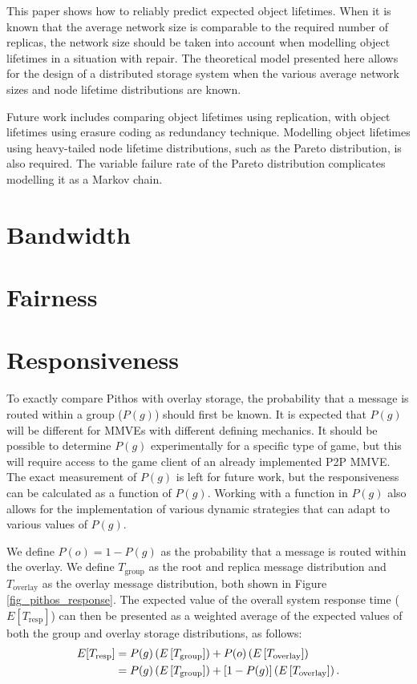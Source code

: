 This paper shows how to reliably predict expected object lifetimes. When it is known that the average network size is comparable to the required number of replicas, the network size should be taken into account when modelling object lifetimes in a situation with repair. The theoretical model presented here allows for the design of a distributed storage system when the various average network sizes and node lifetime distributions are known.

Future work includes comparing object lifetimes using replication, with object lifetimes using erasure coding as redundancy technique. Modelling object lifetimes using heavy-tailed node lifetime distributions, such as the Pareto distribution, is also required. The variable failure rate of the Pareto distribution complicates modelling it as a Markov chain.

\section{Bandwidth}


\section{Fairness}



\section{Responsiveness}
To exactly compare Pithos with overlay storage, the probability that a message is routed within a group ($P(g)$) should first be known. It is
expected that $P(g)$ will be different for MMVEs with different defining mechanics. It should be possible to determine $P(g)$ experimentally for a
specific type of game, but this will require access to the game client of an already implemented P2P MMVE. The exact measurement of $P(g)$ is left
for future work, but the responsiveness can be calculated as a function of $P(g)$. Working with a function in $P(g)$ also allows for the
implementation of various dynamic strategies that can adapt to various values of $P(g)$.

We define $P(o) = 1 - P(g)$ as the probability that a message is routed within the overlay. We define $T_{\textrm{group}}$ as the root and replica
message distribution and $T_{\textrm{overlay}}$ as the overlay message distribution, both shown in Figure \ref{fig_pithos_response}. The expected
value of the overall system response time ($E[T_{\textrm{resp}}]$) can then be presented as a weighted average of the expected values of both the
group and overlay storage distributions, as follows:
%
\begin{align}
    E[T_{\textrm{resp}}] &= P(g)\left(E\left[T_{\textrm{group}}\right]\right) + P(o)\left(E\left[T_{\textrm{overlay}}\right]\right)\notag\\
                         &= P(g)\left(E\left[T_{\textrm{group}}\right]\right) + \left[1 - P(g)\right]\left(E\left[T_{\textrm{overlay}}\right]\right).\label{expected_response_time}
\end{align}

